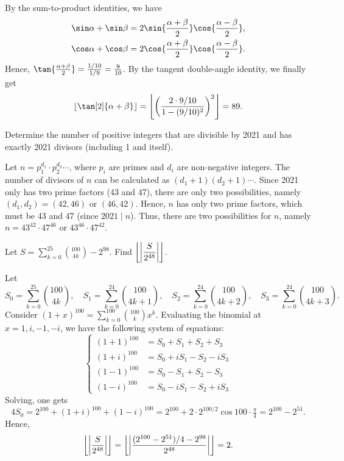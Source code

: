 By the sum-to-product identities, we have 
\begin{align*}
    \sin \a + \sin \b &= 2\sin{\frac{\a+\b}{2}}\cos{\frac{\a - \b}{2}},\\
    \cos \a + \cos \b &= 2\cos{\frac{\a+\b}{2}}\cos{\frac{\a-\b}{2}}.
\end{align*}
Hence, $\tan{\frac{\a+\b}{2}} = \frac{1/10}{1/9} = \frac9{10}$. By the tangent double-angle identity, we finally get \[\floor{\tan[2]{\a + \b}} = \floor{\bp{\frac{2 \cdot 9/10}{1 - (9/10)^2}}^2} = 89.\]

\begin{question}[2]\label{A::2021-O-1-13}
    Determine the number of positive integers that are divisible by 2021 and has exactly 2021 divisors (including 1 and itself).
\end{question}

Let $n = p_1^{d_1} \cdot p_2^{d_2} \cdots$, where $p_i$ are primes and $d_i$ are non-negative integers. The number of divisors of $n$ can be calculated as $(d_1 + 1)(d_2 + 1)\cdots$. Since 2021 only has two prime factors (43 and 47), there are only two possibilities, namely $(d_1, d_2) = (42, 46)$ or $(46, 42)$. Hence, $n$ has only two prime factors, which must be 43 and 47 (since $2021 \mid n$). Thus, there are two possibilities for $n$, namely $n = 43^{42} \cdot 47^{46}$ or $43^{46} \cdot 47^{42}$.

\begin{question}[2]\label{A::2021-O-1-14}
    Let $S = \displaystyle\sum_{k=0}^{25} \binom{100}{4k} - 2^{98}$. Find $\left\lfloor \left\lvert \dfrac{S}{2^{48}} \right\rvert \right\rfloor$.
\end{question}

Let \[S_0 = \sum_{k=0}^{25} \binom{100}{4k}, \quad S_1 = \sum_{k=0}^{24} \binom{100}{4k+1}, \quad S_2 = \sum_{k=0}^{24} \binom{100}{4k+2}, \quad S_3 = \sum_{k=0}^{24} \binom{100}{4k+3}.\] Consider $(1 + x)^{100} = \displaystyle\sum_{k=0}^{100} \binom{100}{k} x^{k}$. Evaluating the binomial at $x = 1, i, -1, -i$, we have the following system of equations: \[\left\{
    \begin{aligned}
        (1+1)^{100} &= S_0 + S_1 + S_2 + S_3\\
        (1+i)^{100} &= S_0 + iS_1 - S_2 - iS_3\\
        (1-1)^{100} &= S_0 - S_1 + S_2 - S_3\\
        (1-i)^{100} &= S_0 - iS_1 - S_2 + iS_3
    \end{aligned}\right.\] Solving, one gets \[4S_0 = 2^{100} + (1+i)^{100} + (1-i)^{100} = 2^{100} + 2 \cdot 2^{100/2}\cos{100 \cdot \tfrac{\pi}4} = 2^{100} - 2^{51}.\] Hence, \[\left\lfloor \left\lvert \frac{S}{2^{48}} \right\rvert \right\rfloor = \left\lfloor \left\lvert \frac{(2^{100} - 2^{51})/4 - 2^{98}}{2^{48}} \right\rvert \right\rfloor = 2.\]

